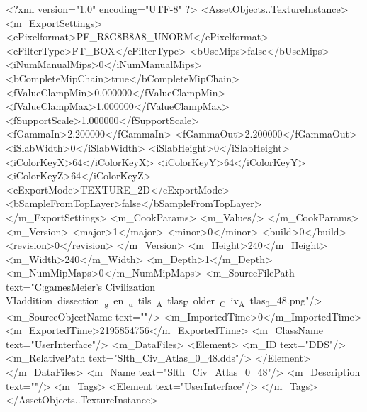 <?xml version="1.0" encoding="UTF-8" ?>
<AssetObjects..TextureInstance>
	<m_ExportSettings>
		<ePixelformat>PF_R8G8B8A8_UNORM</ePixelformat>
		<eFilterType>FT_BOX</eFilterType>
		<bUseMips>false</bUseMips>
		<iNumManualMips>0</iNumManualMips>
		<bCompleteMipChain>true</bCompleteMipChain>
		<fValueClampMin>0.000000</fValueClampMin>
		<fValueClampMax>1.000000</fValueClampMax>
		<fSupportScale>1.000000</fSupportScale>
		<fGammaIn>2.200000</fGammaIn>
		<fGammaOut>2.200000</fGammaOut>
		<iSlabWidth>0</iSlabWidth>
		<iSlabHeight>0</iSlabHeight>
		<iColorKeyX>64</iColorKeyX>
		<iColorKeyY>64</iColorKeyY>
		<iColorKeyZ>64</iColorKeyZ>
		<eExportMode>TEXTURE_2D</eExportMode>
		<bSampleFromTopLayer>false</bSampleFromTopLayer>
	</m_ExportSettings>
	<m_CookParams>
		<m_Values/>
	</m_CookParams>
	<m_Version>
		<major>1</major>
		<minor>0</minor>
		<build>0</build>
		<revision>0</revision>
	</m_Version>
	<m_Height>240</m_Height>
	<m_Width>240</m_Width>
	<m_Depth>1</m_Depth>
	<m_NumMipMaps>0</m_NumMipMaps>
	<m_SourceFilePath text="C:\Users\Sam\Documents\my games\Sid Meier's Civilization VI\Mods\unit addition dissection\python_gen\build_utils\CIV_Atlas_Folder\Slth_Civ_Atlas_0_48.png"/>
	<m_SourceObjectName text=""/>
	<m_ImportedTime>0</m_ImportedTime>
	<m_ExportedTime>2195854756</m_ExportedTime>
	<m_ClassName text="UserInterface"/>
	<m_DataFiles>
		<Element>
			<m_ID text="DDS"/>
			<m_RelativePath text="Slth_Civ_Atlas_0_48.dds"/>
		</Element>
	</m_DataFiles>
	<m_Name text="Slth_Civ_Atlas_0_48"/>
	<m_Description text=""/>
	<m_Tags>
		<Element text="UserInterface"/>
	</m_Tags>
</AssetObjects..TextureInstance>

